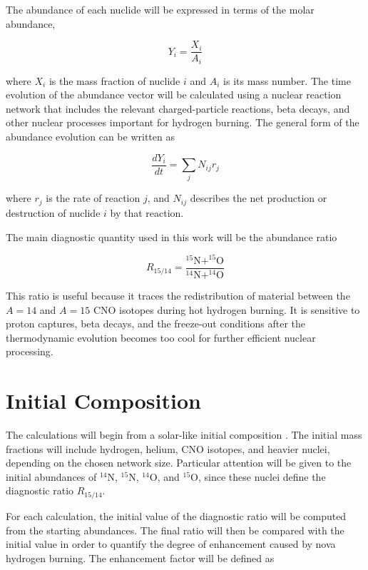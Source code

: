 The abundance of each nuclide will be expressed in terms of the molar abundance,

\begin{equation}
    Y_i = \frac{X_i}{A_i}
\end{equation}

where $X_i$ is the mass fraction of nuclide $i$ and $A_i$ is its mass number. The time evolution of the abundance vector will be calculated using a nuclear reaction network that includes the relevant charged-particle reactions, beta decays, and other nuclear processes important for hydrogen burning. The general form of the abundance evolution can be written as

\begin{equation}
    \frac{dY_i}{dt} = \sum_j N_{ij} r_j 
\end{equation}

where $r_j$ is the rate of reaction $j$, and $N_{ij}$ describes the net production or destruction of nuclide $i$ by that reaction.

The main diagnostic quantity used in this work will be the abundance ratio

\begin{equation}
\label{eq:ratio}
    R_{15/14} =
\frac{^{15}\mathrm{N}+^{15}\mathrm{O}}
{^{14}\mathrm{N}+^{14}\mathrm{O}}
\end{equation}


This ratio is useful because it traces the redistribution of material between the $A=14$ and $A=15$ CNO isotopes during hot hydrogen burning. It is sensitive to proton captures, beta decays, and the freeze-out conditions after the thermodynamic evolution becomes too cool for further efficient nuclear processing.

\section{Initial Composition}

The calculations will begin from a solar-like initial composition \cite{bergemann2025chemical}. The initial mass fractions will include hydrogen, helium, CNO isotopes, and heavier nuclei, depending on the chosen network size. Particular attention will be given to the initial abundances of $^{14}\mathrm{N}$, $^{15}\mathrm{N}$, $^{14}\mathrm{O}$, and $^{15}\mathrm{O}$, since these nuclei define the diagnostic ratio $R_{15/14}$.

For each calculation, the initial value of the diagnostic ratio will be computed from the starting abundances. The final ratio will then be compared with the initial value in order to quantify the degree of enhancement caused by nova hydrogen burning. The enhancement factor will be defined as

